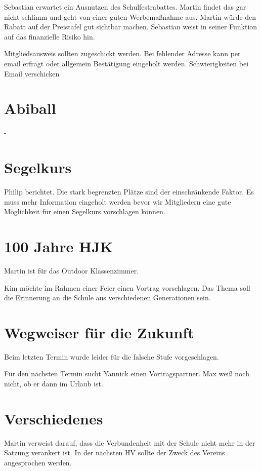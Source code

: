 \documentclass[a4paper, 11pt]{article}
\begin{document}
Sebastian erwartet ein Ausnutzen des Schulfestrabattes.
Martin findet das gar nicht schlimm und geht von einer guten Werbemaßnahme aus.
Martin würde den Rabatt auf der Preistafel gut sichtbar machen.
Sebastian weist in seiner Funktion auf das finanzielle Risiko hin.

Mitgliedsausweis sollten zugeschickt werden. Bei fehlender Adresse kann per email erfragt oder allgemein Bestätigung eingeholt werden.
Schwierigkeiten bei Email verschicken

\section*{Abiball}

-

\section*{Segelkurs}

Philip berichtet. Die stark begrenzten Plätze sind der einschränkende Faktor.
Es muss mehr Information eingeholt werden bevor wir Mitgliedern eine gute Möglichkeit für einen Segelkurs vorschlagen können.

\section*{100 Jahre HJK}

Martin ist für das Outdoor Klassenzimmer.

Kim möchte im Rahmen einer Feier einen Vortrag vorschlagen. Das Thema soll die Erinnerung an die Schule aus verschiedenen Generationen sein.


\section*{Wegweiser für die Zukunft}

Beim letzten Termin wurde leider für die falsche Stufe vorgeschlagen.

Für den nächsten Termin sucht Yannick einen Vortragspartner.
Max weiß noch nicht, ob er dann im Urlaub ist.

\section*{Verschiedenes}

Martin verweist darauf, dass die Verbundenheit mit der Schule nicht mehr in der Satzung verankert ist.
In der nächsten HV sollte der Zweck des Vereins angesprochen werden.
\end{document}
